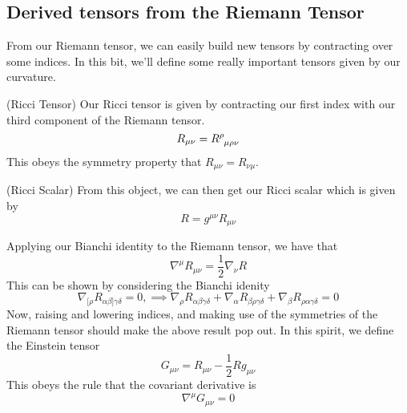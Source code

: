 \pagebreak
\subsection{Derived tensors from the Riemann Tensor} 
From our Riemann tensor, we 
can easily build new tensors by contracting over some indices. 
In this bit, we'll define some really important 
tensors given by our curvature. 

\begin{defn}{(Ricci Tensor)} 
	Our Ricci tensor is given by contracting our first 
index with our third component of the Riemann tensor. 
\[
 R_{ \mu \nu } = R \indices{ ^ \rho _{ \mu \rho \nu } } 
\] This obeys the symmetry property that $  R_{ \mu \nu  }  = 
R_{ \nu \mu } $. 
\end{defn} 

\begin{defn}{(Ricci Scalar)} 
From this object, we can then 
get our Ricci scalar which is given by 
\[
 R = g^{ \mu \nu } R _{ \mu \nu }
\] 
\end{defn} 
Applying our Bianchi identity to the Riemann tensor, we have 
that 
\[
 \nabla ^ \mu R_{ \mu \nu } = \frac{1}{2 } \nabla _ \nu  R 
\] This can be shown by considering 
the Bianchi idenity 
\[
	\nabla _{ [ \rho } R _{ \alpha \beta ] \gamma \delta }  = 0 , 
	\implies
	\nabla _ \rho R_{ \alpha \beta \gamma \delta } + 
	\nabla _\alpha R_{ \beta \rho \gamma \delta } + 
	\nabla _ \beta R_{ \rho \alpha \gamma \delta } = 0 
\] Now, raising and lowering 
indices, and making use of the symmetries 
of the Riemann tensor should make 
the above result pop out. 
In this spirit, we define the Einstein tensor
\[
 G_{ \mu \nu } = R _{ \mu \nu } - \frac{1}{2 } R g_{ \mu \nu }
\] This obeys the rule that the covariant derivative 
is 
\[
 \nabla ^ \mu G _{ \mu \nu } = 0 
\] 
